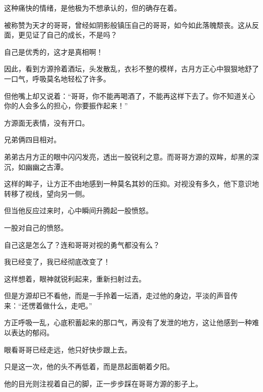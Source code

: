 \begin{this_body}
这种痛快的情绪，是他极为不想承认的，但的确存在着。

被称赞为天才的哥哥，曾经如阴影般镇压自己的哥哥，如今如此落魄颓丧。这从反面，更见证了自己的成长，不是吗？

自己是优秀的，这才是真相啊！

因此，看到方源拎着酒坛，头发散乱，衣衫不整的模样，古月方正心中狠狠地舒了一口气，呼吸莫名地轻松了许多。

但他嘴上却又说着：“哥哥，你不能再喝酒了，不能再这样下去了。你不知道关心你的人会多么的担心，你要振作起来！”

方源面无表情，没有开口。

兄弟俩四目相对。

弟弟古月方正的眼中闪闪发亮，透出一股锐利之意。而哥哥方源的双眸，却黑的深沉，如幽幽之古潭。

这样的眸子，让方正不由地感到一种莫名其妙的压抑。对视没有多久，他下意识地转移了视线，望向另一侧。

但当他反应过来时，心中瞬间升腾起一股愤怒。

一股对自己的愤怒。

自己这是怎么了？连和哥哥对视的勇气都没有么？

我已经变了，我已经彻底改变了！

这样想着，眼神就锐利起来，重新扫射过去。

但是方源却已不看他，而是一手拎着一坛酒，走过他的身边，平淡的声音传来：“还愣着做什么，走吧。”

方正呼吸一乱，心底积蓄起来的那口气，再没有了发泄的地方，这让他感到一种难以表达的郁闷。

眼看哥哥已经走远，他只好快步跟上去。

只是这一次，他的头不再低着，而是昂起面朝着夕阳。

他的目光则注视着自己的脚，正一步步踩在哥哥方源的影子上。

\end{this_body}

